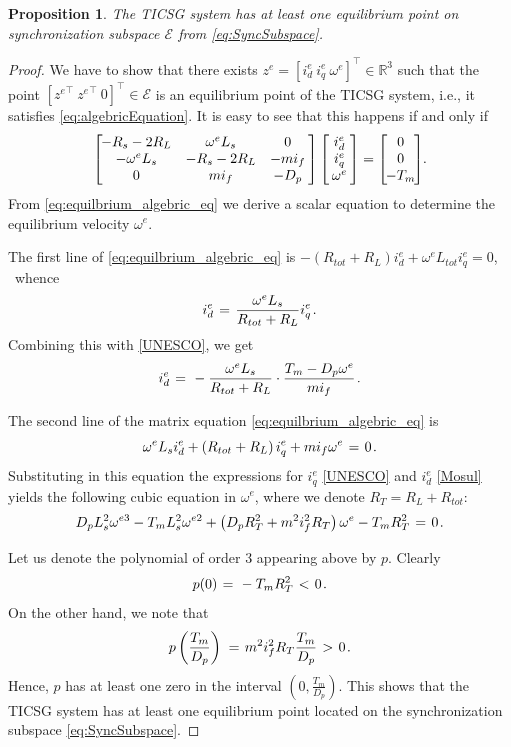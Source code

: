 \documentclass[letterpaper,10pt,conference]{ieeeconf}
\newtheorem{proposition}[theorem]{Proposition}
\newcommand{\BE}{\begin{equation}}
\newcommand{\BEQ}[1]{\BE\label{#1}} %
\newcommand{\rline}  {{\mathbb R}}
\renewcommand{\o}    {{\omega}}
\newcommand{\m}      {{\hbox{\hskip 1pt}}}
\newcommand{\nm}     {{\hbox{\hskip -3pt}}}
\newcommand{\Emscr}  {{\mathcal{E}}}
\begin{document}
\begin{proposition} \label{EqPointsProp2}
The TICSG system has at least one equilibrium point on
synchronization subspace $\Emscr$ from \eqref{eq:SyncSubspace}.
\end{proposition}

\begin{proof}
We have to show that there exists $z^e=[i_d^e\ i_q^e\ \o^e]^\top\in
\rline^3$ such that the point $[{z^e}^\top\ {z^e}^\top\ 0]^\top\in
\Emscr$ is an equilibrium point of the TICSG system, i.e., it
satisfies \eqref{eq:algebricEquation}. It is easy to see that this 
happens if and only if
\begin{equation} \label{eq:equilbrium_algebric_eq}
   \left[\nm\nm\begin{array}{ccc} -R_s-2R_L & \o^e L_s & 0\\
   -\o^e L_s & -R_s-2R_L & -m i_f\\ 0 & m i_f & -D_p
   \end{array} \nm\right] \left[\nm\begin{array}{c} i_d^e\\
   i_q^e\\ \o^e \end{array} \nm\right] = \left[\nm\nm 
   \begin{array}{c} 0\\ 0\\ -T_m\end{array} \nm\nm\right]\nm\m.
\end{equation}
From \eqref{eq:equilbrium_algebric_eq} we derive a scalar equation to
determine the equilibrium velocity $\o^e$.

The first line of \eqref{eq:equilbrium_algebric_eq}
is $-\left(R_{tot}+R_L\right)i_d^e+\o^e L_{tot}i_q^e=0$, \ whence
\vspace{-1mm}
$$i_d^e \m=\m \frac{\o^e L_s}{R_{tot}+R_L} i_q^e \m.$$
Combining this with \eqref{UNESCO}, we get
\BEQ{Mosul}
   i_{d}^{e} \m=\m -\frac{\o^e L_s}{R_{tot}+R_L} \cdot \frac{T_m-D_p
   \o^e}{mi_f} \m.
\end{equation}

The second line of the matrix equation 
\eqref{eq:equilbrium_algebric_eq} is
$$ \o^{e}L_s i_d^e + \left(R_{tot} + R_L\right) i_q^e + mi_f\o^e 
   \m=\m 0 \m.$$
Substituting in this equation the expressions for $i_q^e$ 
\eqref{UNESCO} and $i_d^e$ \eqref{Mosul} yields the following cubic
equation in $\o^e$, where we denote $R_T=R_L+R_{tot}$:
$$ D_p L_s^2\o^{e3}-T_m L_s^2 \o^{e2} +\left(D_p R_T^2+m^2 i_f^2 
   R_T\right) \o^e - T_m R_T^2 \m=\m 0 \m.$$

Let us denote the polynomial of order 3 appearing above by $p$. 
Clearly \vspace{-2mm}
$$p(0) \m=\m -T_m R_T^2 \m<\m 0 \m.$$
On the other hand, we note that 
$$ p\left(\frac{T_m}{D_p}\right) \m=\m m^2 i_f^2 R_T\frac{T_m}{D_p} 
   \m>\m 0 \m.$$
Hence, $p$ has at least one zero in the interval $\left(0,
\frac{T_m}{D_p}\right)$. This shows that the TICSG system has at least
one equilibrium point located on the synchronization subspace 
\eqref{eq:SyncSubspace}.
\end{proof}
\end{document}
